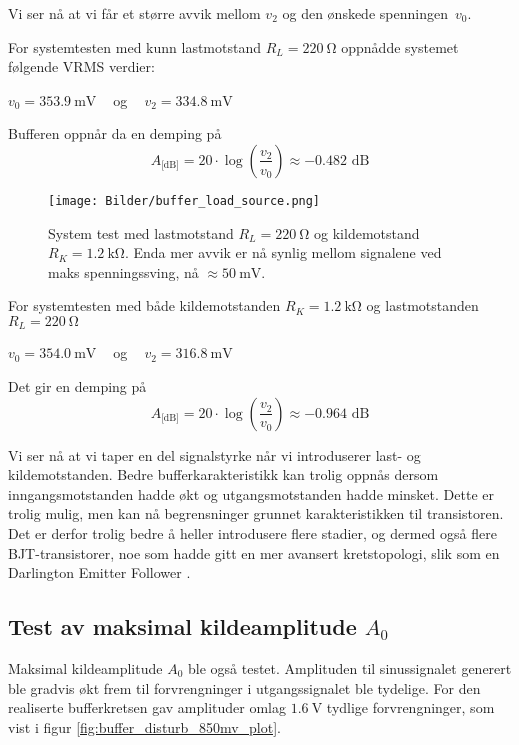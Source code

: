 Vi ser nå at vi får et større avvik mellom $v_2$ og den ønskede spenningen $v_0$. 

For systemtesten med kunn lastmotstand $R_L = \SI{220}{\ohm}$ oppnådde systemet følgende VRMS verdier:
\begin{center}
    $v_0 = \SI{353.9}{\milli\volt}\:\:\:\:$ og $\:\:\:\:v_2 = \SI{334.8}{\milli\volt}$ 
\end{center}

Bufferen oppnår da en demping på 
\[
    A_\text{[dB]} = 20 \cdot \log{\left(\frac{v_2}{v_0}\right)} \approx -0.482 \text{ dB}
\]

\begin{figure}[H]
    \centering 
    \texttt{[image: Bilder/buffer\_load\_source.png]}
    \caption{System test med lastmotstand $R_L = \SI{220}{\ohm}$ og kildemotstand $R_K = \SI{1.2}{\kilo\ohm}$.
    Enda mer avvik er nå synlig mellom signalene ved maks spenningssving, nå $\approx \SI{50}{\milli\volt}$.}
    \label{fig:buffer_load_source_res_plot}
\end{figure}

For systemtesten med både kildemotstanden $R_K = \SI{1.2}{\kilo\ohm}$ og
lastmotstanden $R_L = \SI{220}{\ohm}$

\begin{center}
    $v_0 = \SI{354.0}{\milli\volt}\:\:\:\:$ og $\:\:\:\:v_2 = \SI{316.8}{\milli\volt}$ 
\end{center}

Det gir en demping på
\[
    A_\text{[dB]} = 20 \cdot \log{\left(\frac{v_2}{v_0}\right)} \approx -0.964 \text{ dB}
\]

Vi ser nå at vi taper en del signalstyrke når vi introduserer last- og kildemotstanden. Bedre 
bufferkarakteristikk kan trolig oppnås dersom inngangsmotstanden hadde økt og utgangsmotstanden hadde 
minsket. Dette er trolig mulig, men kan nå begrensninger grunnet karakteristikken til transistoren.
Det er derfor trolig bedre å heller introdusere flere stadier, og dermed også flere BJT-transistorer, noe som 
hadde gitt en mer avansert kretstopologi, slik som en Darlington Emitter Follower \cite{darlington}.

\subsection{Test av maksimal kildeamplitude $A_0$}
Maksimal kildeamplitude $A_0$ ble også testet. Amplituden til sinussignalet generert ble gradvis økt frem til 
forvrengninger i utgangssignalet ble tydelige. For den realiserte bufferkretsen gav amplituder omlag $\SI{1.6}{\volt}$ 
tydlige forvrengninger, som vist i figur \ref{fig:buffer_disturb_850mv_plot}.

